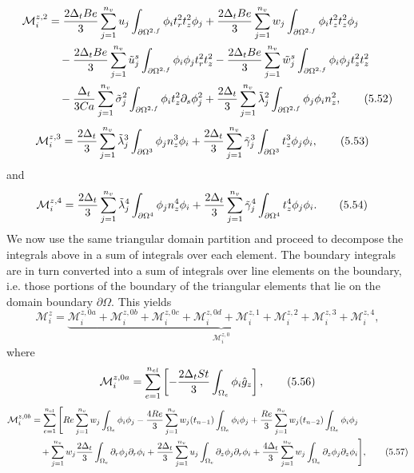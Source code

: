 \documentclass{article}
\begin{document}
\begin{align}
\mathcal{M}_i^{z,2} &= \frac{2\Delta_t Be}{3} \sum_{j=1}^{n_v} u_j \int_{\partial \Omega^{2,f}} \phi_i t_r^2 t_z^2 \phi_j + \frac{2\Delta_t Be}{3} \sum_{j=1}^{n_v} w_j \int_{\partial \Omega^{2,f}} \phi_i t_z^2 t_z^2 \phi_j \nonumber\\
&\quad - \frac{2\Delta_t Be}{3} \sum_{j=1}^{n_v} \tilde{u}_j^s \int_{\partial \Omega^{2,f}} \phi_i \phi_j t_r^2 t_z^2 - \frac{2\Delta_t Be}{3} \sum_{j=1}^{n_v} \tilde{w}_j^s \int_{\partial \Omega^{2,f}} \phi_i \phi_j t_z^2 t_z^2 \nonumber\\
&\quad - \frac{\Delta_t}{3Ca} \sum_{j=1}^{n_v} \tilde{\sigma}_j^2 \int_{\partial \Omega^{2,f}} \phi_i t_z^2 \partial_s \phi_j^2 + \frac{2\Delta_t}{3} \sum_{j=1}^{n_v} \tilde{\lambda}_j^2 \int_{\partial \Omega^{2,f}} \phi_j \phi_i n_z^2, \tag{5.52}
\end{align}
\begin{align}
\mathcal{M}_i^{z,3} &= \frac{2\Delta_t}{3} \sum_{j=1}^{n_v} \tilde{\lambda}_j^3 \int_{\partial \Omega^{3}} \phi_j n_z^3 \phi_i + \frac{2\Delta_t}{3} \sum_{j=1}^{n_v} \tilde{\gamma}_j^3 \int_{\partial \Omega^{3}} t_z^3 \phi_j \phi_i, \tag{5.53}
\end{align}
and
\begin{align}
\mathcal{M}_i^{z,4} &= \frac{2\Delta_t}{3} \sum_{j=1}^{n_v} \tilde{\lambda}_j^4 \int_{\partial \Omega^{4}} \phi_j n_z^4 \phi_i + \frac{2\Delta_t}{3} \sum_{j=1}^{n_v} \tilde{\gamma}_j^4 \int_{\partial \Omega^{4}} t_z^4 \phi_j \phi_i. \tag{5.54}
\end{align}
We now use the same triangular domain partition and proceed to decompose the integrals above in a sum of integrals over each element. The boundary integrals are in turn converted into a sum of integrals over line elements on the boundary, i.e. those portions of the boundary of the triangular elements that lie on the domain boundary $\partial \Omega$. This yields
\begin{equation}
\mathcal{M}_i^z = \underbrace{\mathcal{M}_i^{z,0a} + \mathcal{M}_i^{z,0b} + \mathcal{M}_i^{z,0c} + \mathcal{M}_i^{z,0d} + \mathcal{M}_i^{z,1} + \mathcal{M}_i^{z,2} + \mathcal{M}_i^{z,3} + \mathcal{M}_i^{z,4}}_{\mathcal{M}_i^{z,0}}, \tag{5.55}
\end{equation}
where
\begin{equation}
\mathcal{M}_i^{z,0a} = \sum_{e=1}^{n_{el}} \left[ -\frac{2\Delta_t St}{3} \int_{\Omega_e} \phi_i \hat{g}_z \right], \tag{5.56}
\end{equation}
\begin{align}
\mathcal{M}_i^{z,0b} &= \sum_{e=1}^{n_{el}} \Bigg[ Re \sum_{j=1}^{n_v} w_j \int_{\Omega_e} \phi_i \phi_j - \frac{4Re}{3} \sum_{j=1}^{n_v} w_j(t_{n-1}) \int_{\Omega_e} \phi_i \phi_j + \frac{Re}{3} \sum_{j=1}^{n_v} w_j(t_{n-2}) \int_{\Omega_e} \phi_i \phi_j \nonumber\\
&\quad + \sum_{j=1}^{n_v} w_j \frac{2\Delta_t}{3} \int_{\Omega_e} \partial_r \phi_j \partial_r \phi_i + \frac{2\Delta_t}{3} \sum_{j=1}^{n_v} u_j \int_{\Omega_e} \partial_z \phi_j \partial_r \phi_i + \frac{4\Delta_t}{3} \sum_{j=1}^{n_v} w_j \int_{\Omega_e} \partial_z \phi_j \partial_z \phi_i \Bigg], \tag{5.57}
\end{align}
\end{document}
